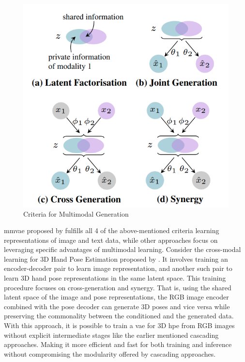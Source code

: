 \begin{figure}[!h]
    \centering
    \includegraphics[scale=0.4]{figures/background/criteria.png}
    \caption{Criteria for Multimodal Generation \cite{MMVAE}}
    \label{fig:criteria}
\end{figure}

\ac{mmvae} proposed by \cite{MMVAE} fulfills all 4 of the above-mentioned criteria learning representations of image and text data, while other approaches focus on leveraging specific advantages of multimodal learning. Consider the cross-modal learning for 3D Hand Pose Estimation proposed by \cite{crossmodal}. It involves training an encoder-decoder pair to learn image representation, and another such pair to learn 3D hand pose representations in the same latent space. This training procedure focuses on cross-generation and synergy. That is, using the shared latent space of the image and pose representations, the RGB image encoder combined with the pose decoder can generate 3D poses and vice versa while preserving the commonality between the conditioned and the generated data. With this approach, it is possible to train a \ac{vae} for 3D \ac{hpe} from RGB images without explicit intermediate stages like the earlier mentioned cascading approaches. Making it more efficient and fast for both training and inference without compromising the modularity offered by cascading approaches.

